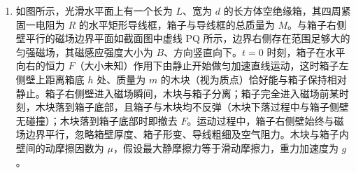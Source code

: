 \documentclass[\gkver]{gaokaozhenti}
\begin{document}
\begin{enumerate}
{由洛伦兹力提供向心力

$qv_{0}B_{1} = m\frac{v_{0}^{2}}{r_{1}}$

联立可得 $B_{1} = \frac{mU}{qdB_{0}L}$

由于 $B_{2} < B_{1}$，根据洛伦兹力提供向心力

$qv_{0}B_{2} = m\frac{v_{0}^{2}}{r_{2}}$

解得 $r_{2} > L$

当 $B_{2} = 0$ 时粒子在磁屏蔽区向上做匀速直线运动，离开磁屏蔽区后根据左手定则，粒子向左偏转，如图所示。


根据洛伦兹力提供向心力

$qv_{0}B_{1} = m\frac{v_{0}^{2}}{r_{3}}$

可得 $r_{3} = r_{1} = L$

故粒子打在 $y$ 轴 $3L$ 处，综上所述 $y$ 轴上可能检测到该粒子的范围为 $L < y < 3L$。

（3）若在 Q 处检测到该粒子，如图。


由几何关系可知 $r_{2}^{2} = (2L)^{2} + (r_{2} - L)^{2}$

解得 $r_{2} = \frac{5}{2}L$

由洛伦兹力提供向心力

$qv_{0}B_{2} = m\frac{v_{0}^{2}}{r_{2}}$

联立解得 $B_{2} = \frac{2mU}{5qB_{0}dL}$

其中 $B_{1} = \frac{mU}{qdB_{0}L}$

根据磁屏蔽效率 $\eta = \frac{B_{1} - B_{2}}{B_{1}} \times 100\%$ 可得若在 Q 处检测到该粒子，则 $\eta = 60\%$。
}

\item
如图所示，光滑水平面上有一个长为 $L$、宽为 $d$ 的长方体空绝缘箱，其四周紧固一电阻为 $R$ 的水平矩形导线框，箱子与导线框的总质量为 $M$。与箱子右侧壁平行的磁场边界平面如截面图中虚线 PQ 所示，边界右侧存在范围足够大的匀强磁场，其磁感应强度大小为 $B$、方向竖直向下。$t = 0$ 时刻，箱子在水平向右的恒力 $F$（大小未知）作用下由静止开始做匀加速直线运动，这时箱子左侧壁上距离箱底 $h$ 处、质量为 $m$ 的木块（视为质点）恰好能与箱子保持相对静止。箱子右侧壁进入磁场瞬间，木块与箱子分离；箱子完全进入磁场前某时刻，木块落到箱子底部，且箱子与木块均不反弹（木块下落过程中与箱子侧壁无碰撞）；木块落到箱子底部时即撤去 $F$。运动过程中，箱子右侧壁始终与磁场边界平行，忽略箱壁厚度、箱子形变、导线粗细及空气阻力。木块与箱子内壁间的动摩擦因数为 $\mu$，假设最大静摩擦力等于滑动摩擦力，重力加速度为 $g$。


\end{enumerate}
\end{document}
